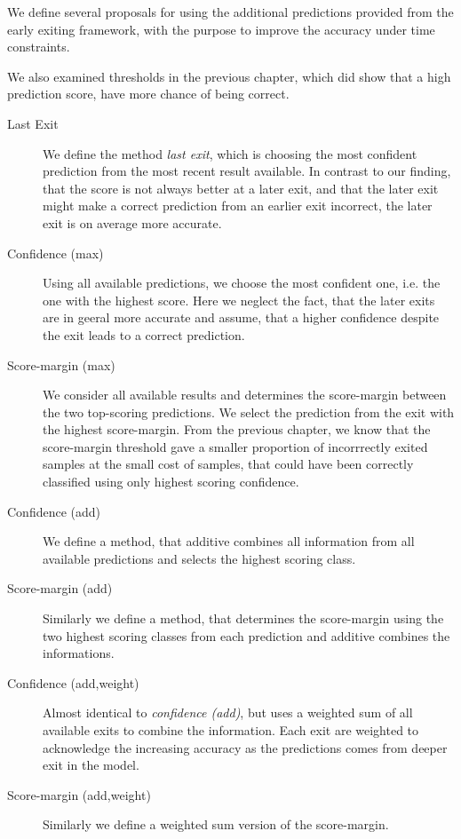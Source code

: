 We define several proposals for using the additional predictions provided from the early exiting framework, with the purpose to improve the accuracy under time constraints. 

We also examined thresholds in the previous chapter, which did show that a high prediction score, have more chance of being correct.       

\begin{description}
	\item[Last Exit] We define the method \emph{last exit}, which is choosing the most confident prediction from the most recent result available. In contrast to our finding, that the score is not always better at a later exit, and that the later exit might make a correct prediction from an earlier exit incorrect, the later exit is on average more accurate.
	\item[Confidence (max)] Using all available predictions, we choose the most confident one, i.e. the one with the highest score. Here we neglect the fact, that the later exits are in geeral more accurate and assume, that a higher confidence despite the exit leads to a correct prediction.
	\item[Score-margin (max)] We consider all available results and determines the score-margin between the two top-scoring predictions. We select the prediction from the exit with the highest score-margin. From the previous chapter, we know that the score-margin threshold gave a smaller proportion of incorrrectly exited samples at the small cost of samples, that could have been correctly classified using only highest scoring confidence.
	\item[Confidence (add)] We define a method, that additive combines all information from all available predictions and selects the highest scoring class. 
	\item[Score-margin (add)] Similarly we define a method, that determines the score-margin using the two highest scoring classes from each prediction and additive combines the informations.
	\item[Confidence (add,weight)] Almost identical to \emph{confidence (add)}, but uses a weighted sum of all available exits to combine the information. Each exit are weighted to acknowledge the increasing accuracy as the predictions comes from deeper exit in the model.  
	\item[Score-margin (add,weight)] Similarly we define a weighted sum version of the score-margin. 
\end{description}

